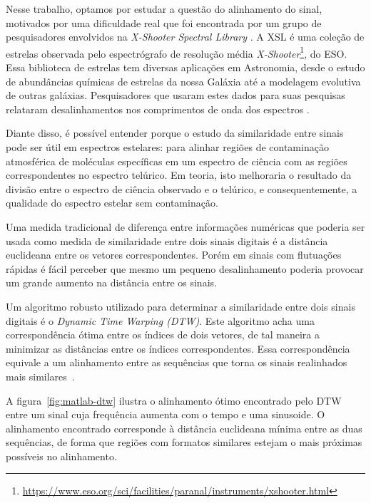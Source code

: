 Nesse trabalho, optamos por estudar a questão do alinhamento do sinal, motivados por uma dificuldade real que foi encontrada por um grupo de pesquisadores envolvidos na \textit{X-Shooter Spectral Library} \citep[][XSL]{Chen2014TheXS}. A XSL é uma coleção de estrelas observada pelo espectrógrafo de resolução média \textit{X-Shooter}\footnote{\url{https://www.eso.org/sci/facilities/paranal/instruments/xshooter.html}}, do ESO. Essa biblioteca de estrelas tem diversas aplicações em Astronomia, desde o estudo de abundâncias químicas de estrelas da nossa Galáxia até a modelagem evolutiva de outras galáxias. Pesquisadores que usaram estes dados para suas pesquisas relataram desalinhamentos nos comprimentos de onda dos espectros \citep{unpublished-xshooter-data-release, wavelength-shifts}.

Diante disso, é possível entender porque o estudo da similaridade entre sinais pode ser útil em espectros estelares: para alinhar regiões de contaminação atmosférica de moléculas específicas em um espectro de ciência com as regiões correspondentes no espectro telúrico. Em teoria, isto melhoraria o resultado da divisão entre o espectro de ciência observado e o telúrico, e consequentemente, a qualidade do espectro estelar sem contaminação.

Uma medida tradicional de diferença entre informações numéricas que poderia ser usada como medida de similaridade entre dois sinais digitais é a distância euclideana entre os vetores correspondentes. Porém em sinais com flutuações rápidas é fácil perceber que mesmo um pequeno desalinhamento poderia provocar um grande aumento na distância entre os sinais.

Um algoritmo robusto utilizado para determinar a similaridade entre dois sinais digitais é o \textit{Dynamic Time Warping (DTW)}. Este algoritmo acha uma correspondência ótima entre os índices de dois vetores, de tal maneira a minimizar as distâncias entre os índices correspondentes. Essa correspondência equivale a um alinhamento entre as sequências que torna os sinais realinhados mais similares~\citep{shou2005fast}. 

A figura~\ref{fig:matlab-dtw} ilustra o alinhamento ótimo encontrado pelo DTW entre um sinal cuja frequência aumenta com o tempo e uma sinusoide. O alinhamento encontrado corresponde à distância euclideana mínima entre as duas sequências, de forma que regiões com formatos similares estejam o mais próximas possíveis no alinhamento.

